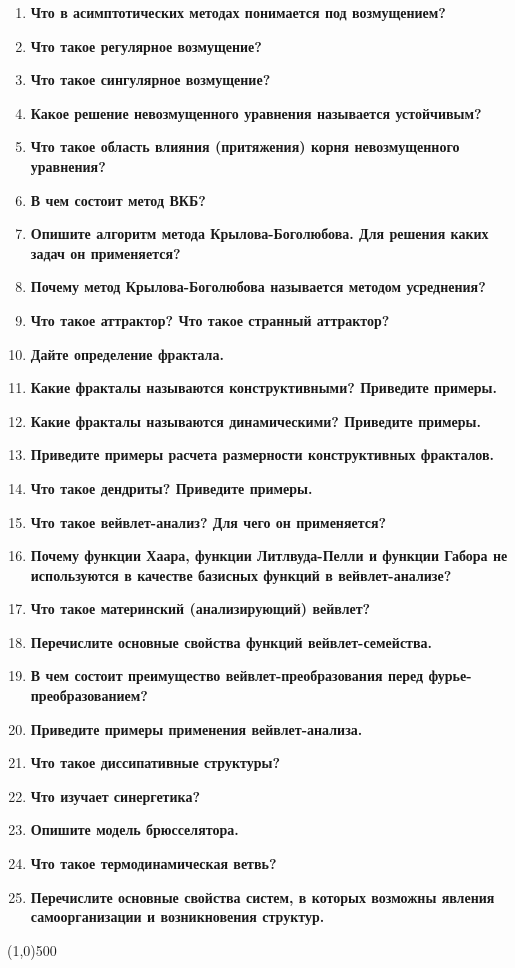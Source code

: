 \begin{enumerate}[label=\textbf{\underline{\arabic*.}}]
\item \textbf{Что в асимптотических методах понимается под возмущением?}
\item \textbf{Что такое регулярное возмущение?}
\item \textbf{Что такое сингулярное возмущение?}
\item \textbf{Какое решение невозмущенного уравнения называется устойчивым?}
\item \textbf{Что такое область влияния (притяжения) корня невозмущенного уравнения?}
\item \textbf{В чем состоит метод ВКБ?}
\item \textbf{Опишите алгоритм метода Крылова-Боголюбова. Для решения каких задач он применяется?}
\item \textbf{Почему метод Крылова-Боголюбова называется методом усреднения?}
\item \textbf{Что такое аттрактор? Что такое странный аттрактор?}
\item \textbf{Дайте определение фрактала.}
\item \textbf{Какие фракталы называются конструктивными? Приведите примеры.}
\item \textbf{Какие фракталы называются динамическими? Приведите примеры.}
\item \textbf{Приведите примеры расчета размерности конструктивных фракталов.}
\item \textbf{Что такое дендриты? Приведите примеры.}
\item \textbf{Что такое вейвлет-анализ? Для чего он применяется?}
\item \textbf{Почему функции Хаара, функции Литлвуда-Пелли и функции Габора не используются в качестве базисных функций в вейвлет-анализе?}
\item \textbf{Что такое материнский (анализирующий) вейвлет?}
\item \textbf{Перечислите основные свойства функций вейвлет-семейства.}
\item \textbf{В чем состоит преимущество вейвлет-преобразования перед фурье-преобразованием?}
\item \textbf{Приведите примеры применения вейвлет-анализа.}
\item \textbf{Что такое диссипативные структуры?}
\item \textbf{Что изучает синергетика?}
\item \textbf{Опишите модель брюсселятора.}
\item \textbf{Что такое термодинамическая ветвь?}
\item \textbf{Перечислите основные свойства систем, в которых возможны явления самоорганизации и возникновения структур.}
\end{enumerate}
\vfill\line(1,0){500}

